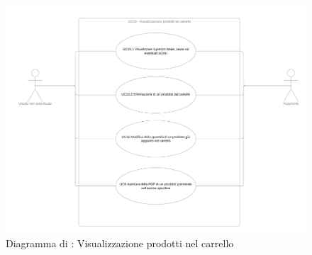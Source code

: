 

\begin{figure}[H]
    \centering
    \includegraphics[width=\textwidth]{Immagini/DiagrammiUC/UC10VisualizzazioneProdottiNelCarrello.png}
    \caption{Diagramma di \actualUC: Visualizzazione prodotti nel carrello} 
    \label{fig:VisualizzazioneProdottiNelCarrello}
\end{figure}

